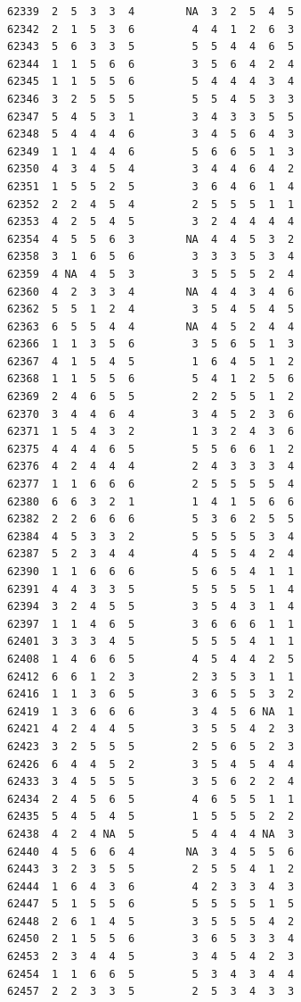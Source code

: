 \documentclass[
  letterpaper,
  DIV=11,
  numbers=noendperiod]{scrreprt}
\begin{document}
\begin{verbatim}
62339  2  5  3  3  4        NA  3  2  5  4  5
62342  2  1  5  3  6         4  4  1  2  6  3
62343  5  6  3  3  5         5  5  4  4  6  5
62344  1  1  5  6  6         3  5  6  4  2  4
62345  1  1  5  5  6         5  4  4  4  3  4
62346  3  2  5  5  5         5  5  4  5  3  3
62347  5  4  5  3  1         3  4  3  3  5  5
62348  5  4  4  4  6         3  4  5  6  4  3
62349  1  1  4  4  6         5  6  6  5  1  3
62350  4  3  4  5  4         3  4  4  6  4  2
62351  1  5  5  2  5         3  6  4  6  1  4
62352  2  2  4  5  4         2  5  5  5  1  1
62353  4  2  5  4  5         3  2  4  4  4  4
62354  4  5  5  6  3        NA  4  4  5  3  2
62358  3  1  6  5  6         3  3  3  5  3  4
62359  4 NA  4  5  3         3  5  5  5  2  4
62360  4  2  3  3  4        NA  4  4  3  4  6
62362  5  5  1  2  4         3  5  4  5  4  5
62363  6  5  5  4  4        NA  4  5  2  4  4
62366  1  1  3  5  6         3  5  6  5  1  3
62367  4  1  5  4  5         1  6  4  5  1  2
62368  1  1  5  5  6         5  4  1  2  5  6
62369  2  4  6  5  5         2  2  5  5  1  2
62370  3  4  4  6  4         3  4  5  2  3  6
62371  1  5  4  3  2         1  3  2  4  3  6
62375  4  4  4  6  5         5  5  6  6  1  2
62376  4  2  4  4  4         2  4  3  3  3  4
62377  1  1  6  6  6         2  5  5  5  5  4
62380  6  6  3  2  1         1  4  1  5  6  6
62382  2  2  6  6  6         5  3  6  2  5  5
62384  4  5  3  3  2         5  5  5  5  3  4
62387  5  2  3  4  4         4  5  5  4  2  4
62390  1  1  6  6  6         5  6  5  4  1  1
62391  4  4  3  3  5         5  5  5  5  1  4
62394  3  2  4  5  5         3  5  4  3  1  4
62397  1  1  4  6  5         3  6  6  6  1  1
62401  3  3  3  4  5         5  5  5  4  1  1
62408  1  4  6  6  5         4  5  4  4  2  5
62412  6  6  1  2  3         2  3  5  3  1  1
62416  1  1  3  6  5         3  6  5  5  3  2
62419  1  3  6  6  6         3  4  5  6 NA  1
62421  4  2  4  4  5         3  5  5  4  2  3
62423  3  2  5  5  5         2  5  6  5  2  3
62426  6  4  4  5  2         3  5  4  5  4  4
62433  3  4  5  5  5         3  5  6  2  2  4
62434  2  4  5  6  5         4  6  5  5  1  1
62435  5  4  5  4  5         1  5  5  5  2  2
62438  4  2  4 NA  5         5  4  4  4 NA  3
62440  4  5  6  6  4        NA  3  4  5  5  6
62443  3  2  3  5  5         2  5  5  4  1  2
62444  1  6  4  3  6         4  2  3  3  4  3
62447  5  1  5  5  6         5  5  5  5  1  5
62448  2  6  1  4  5         3  5  5  5  4  2
62450  2  1  5  5  6         3  6  5  3  3  4
62453  2  3  4  4  5         3  4  5  4  2  3
62454  1  1  6  6  5         5  3  4  3  4  4
62457  2  2  3  3  5         2  5  3  4  3  3

\end{verbatim}
\end{document}
